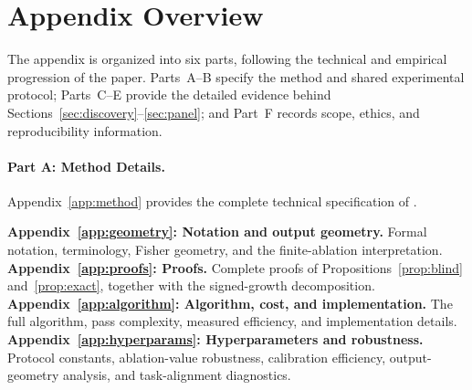 
\section*{Appendix Overview}

The appendix is organized into six parts, following the technical and empirical progression of the paper.
Parts~A--B specify the method and shared experimental protocol; Parts~C--E provide the detailed evidence behind Sections~\ref{sec:discovery}--\ref{sec:panel}; and Part~F records scope, ethics, and reproducibility information.

\paragraph{Part A: Method Details.}
Appendix~\ref{app:method} provides the complete technical specification of \coax.
\vspace{-1mm}

\noindent\textbf{Appendix~\ref{app:geometry}: Notation and output geometry.}
Formal notation, terminology, Fisher geometry, and the finite-ablation interpretation.\\
\noindent\textbf{Appendix~\ref{app:proofs}: Proofs.}
Complete proofs of Propositions~\ref{prop:blind} and~\ref{prop:exact}, together with the signed-growth decomposition.\\
\noindent\textbf{Appendix~\ref{app:algorithm}: Algorithm, cost, and implementation.}
The full algorithm, pass complexity, measured efficiency, and implementation details.\\
\noindent\textbf{Appendix~\ref{app:hyperparams}: Hyperparameters and robustness.}
Protocol constants, ablation-value robustness, calibration efficiency, output-geometry analysis, and task-alignment diagnostics.

